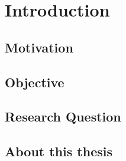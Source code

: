 \chapter{Introduction}
\section{Motivation}
\section{Objective}
\section{Research Question}
\section{About this thesis}